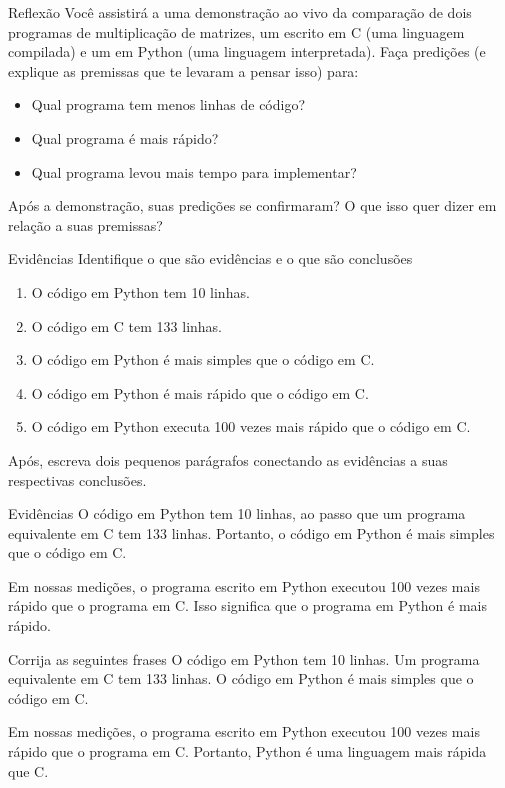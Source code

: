\documentclass{beamer}
\begin{document}
\begin{frame}[fragile]{Reflexão}
  \centering
  \large
  Você assistirá a uma demonstração ao vivo da comparação de dois programas de
  multiplicação de matrizes, um escrito em C (uma linguagem compilada) e um em
  Python (uma linguagem interpretada). Faça predições (e explique as premissas
  que te levaram a pensar isso) para:
  \begin{itemize}
  \item Qual programa tem menos linhas de código?
  \item Qual programa é mais rápido?
  \item Qual programa levou mais tempo para implementar?
  \end{itemize}
  Após a demonstração, suas predições se confirmaram? O que isso quer dizer em
  relação a suas premissas?
\end{frame}

\begin{frame}[fragile]{Evidências}
  \centering
  \large
  Identifique o que são evidências e o que são conclusões
  \begin{enumerate}
  \item O código em Python tem 10 linhas.
  \item O código em C tem 133 linhas.
  \item O código em Python é mais simples que o código em C.
  \item O código em Python é mais rápido que o código em C.
  \item O código em Python executa 100 vezes mais rápido que o código em C.
  \end{enumerate}
  Após, escreva dois pequenos parágrafos conectando as evidências a suas
  respectivas conclusões.
\end{frame}

\begin{frame}[fragile]{Evidências}
  \centering
  O código em Python tem 10 linhas, ao passo que um programa equivalente em C
  tem 133 linhas. Portanto, o código em Python é mais simples que o código em C.
  \vspace{2cm}

  Em nossas medições, o programa escrito em Python executou 100 vezes mais
  rápido que o programa em C. Isso significa que o programa em Python é mais
  rápido.
\end{frame}

\begin{frame}[fragile]{Corrija as seguintes frases}
  \centering
  O código em Python tem 10 linhas. Um programa equivalente em C
  tem 133 linhas. O código em Python é mais simples que o código em C.
  \vspace{2cm}

  Em nossas medições, o programa escrito em Python executou 100 vezes mais
  rápido que o programa em C. Portanto, Python é uma linguagem mais rápida
  que C.
\end{frame}
\end{document}
